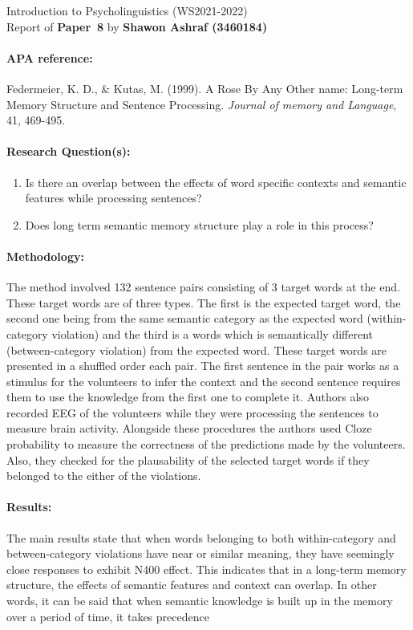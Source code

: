 \documentclass[12pt]{report}
\newcommand{\student}[3]{\begin{tcolorbox}\noindent Introduction to
    Psycholinguistics (WS2021-2022) \\ Report of \textbf{Paper~#3} by
    \textbf{#1 (#2)} 
  \end{tcolorbox}}
\begin{document}
\student{Shawon Ashraf}{3460184}{8}


\paragraph{APA reference:}
Federmeier, K. D., & Kutas, M. (1999). A Rose By Any Other name: Long-term Memory Structure and Sentence Processing. \textit{Journal of memory and Language}, 41, 469-495.


\paragraph{Research Question(s):}
\begin{enumerate}
    \item Is there an overlap between the effects of word specific contexts and semantic features while processing sentences?
    \item Does long term semantic memory structure play a role in this process?
\end{enumerate}
\vfill
\paragraph{Methodology:} 
The method involved 132 sentence pairs consisting of 3 target words at the end. These target words are of three types. The first is the expected target word, the second one being from the same semantic category as the expected word (within-category violation) and the third is a words which is semantically different (between-category violation) from the expected word. These target words are presented in a shuffled order each pair.  The first sentence in the pair works as a stimulus for the volunteers to infer the context and  the second sentence requires them to use the knowledge from the first one to complete it. Authors also recorded EEG of the volunteers while they were processing the sentences to measure brain activity. Alongside these procedures the authors used Cloze probability to measure the correctness of the predictions made by the volunteers. Also, they checked for the plausability of the selected target words if they belonged to the either of the violations. 
\vfill

\paragraph{Results:}
The main results state that when words belonging to both within-category and between-category violations have near or similar meaning, they have seemingly close responses to exhibit N400 effect. This indicates that in a long-term memory structure, the effects of semantic features and context can overlap. In other words, it can be said that when semantic knowledge is built up in the memory over a period of time, it takes precedence
\vfill
\end{document}
